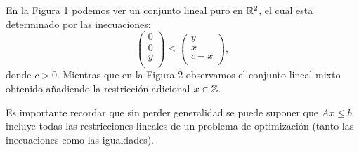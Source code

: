 \begin{eje}

En la Figura 1 podemos ver un conjunto lineal puro en $\mathbb R^2$, el cual esta determinado por las inecuaciones:
$$\begin{pmatrix}    
0\\ 
0\\
y\\ 
\end{pmatrix}\leq\begin{pmatrix}    
y\\ 
x\\
c-x\\ 
\end{pmatrix},
$$
donde $c>0$. Mientras que en la Figura 2 observamos el conjunto lineal mixto obtenido añadiendo la restricción adicional $x\in \mathbb Z$.

Es importante recordar que sin perder generalidad se puede suponer que $Ax \leq b$ incluye todas las restricciones lineales de un problema de optimización (tanto las inecuaciones como las igualdades).


\end{eje}
